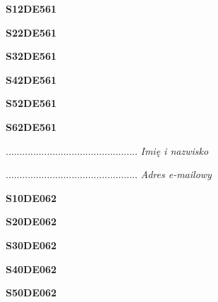 \begin{turn}{90}\huge \textbf{S12DE561}\end{turn}

\begin{turn}{90}\huge \textbf{S22DE561}\end{turn}

\begin{turn}{90}\huge \textbf{S32DE561}\end{turn}

\begin{turn}{90}\huge \textbf{S42DE561}\end{turn}

\begin{turn}{90}\huge \textbf{S52DE561}\end{turn}

\begin{turn}{90}\huge \textbf{S62DE561}\end{turn}

\begin{turn}{90}\begin{minipage}{\linewidth} \vspace{20mm} ................................................  \textit{Imię i nazwisko}\end{minipage}\end{turn}

\begin{turn}{90}\begin{minipage}{\linewidth} \vspace{20mm} ................................................  \textit{Adres e-mailowy}\end{minipage}\end{turn}

\begin{turn}{90}\huge \textbf{S10DE062}\end{turn}

\begin{turn}{90}\huge \textbf{S20DE062}\end{turn}

\begin{turn}{90}\huge \textbf{S30DE062}\end{turn}

\begin{turn}{90}\huge \textbf{S40DE062}\end{turn}

\begin{turn}{90}\huge \textbf{S50DE062}\end{turn}


